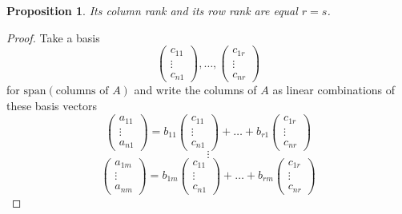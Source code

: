 \documentclass[11pt]{amsart}
\newtheorem{proposition}[theorem]{Proposition}
\theoremstyle{definition}
\begin{document}
\begin{proposition} Its column rank and its row rank are equal $r = s$.
\end{proposition}
\begin{proof} Take a basis
$$\left( \begin{array}{c} c_{11} \\ \vdots \\ c_{n1} \end{array} \right), \dots , \left( \begin{array}{c} c_{1r} \\ \vdots \\ c_{nr} \end{array} \right)$$
for $\text{span}(\text{columns of } A)$ and write the columns of $A$ as linear combinations of these basis vectors
$$\left( \begin{array}{c} a_{11} \\ \vdots \\ a_{n1} \end{array} \right) = b_{11} \left( \begin{array}{c} c_{11} \\ \vdots \\ c_{n1} \end{array} \right) + \dots + b_{r1} \left( \begin{array}{c} c_{1r} \\ \vdots \\ c_{nr} \end{array} \right)$$
$$\vdots$$
$$\left( \begin{array}{c} a_{1m} \\ \vdots \\ a_{nm} \end{array} \right) = b_{1m} \left( \begin{array}{c} c_{11} \\ \vdots \\ c_{n1} \end{array} \right) + \dots + b_{rm} \left( \begin{array}{c} c_{1r} \\ \vdots \\ c_{nr} \end{array} \right)$$


\end{proof}
\end{document}
